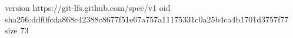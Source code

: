 version https://git-lfs.github.com/spec/v1
oid sha256:ddf0fcda868c42388c8677f51e67a757a11175331c0a25b4ca4b1701d3757f77
size 73
